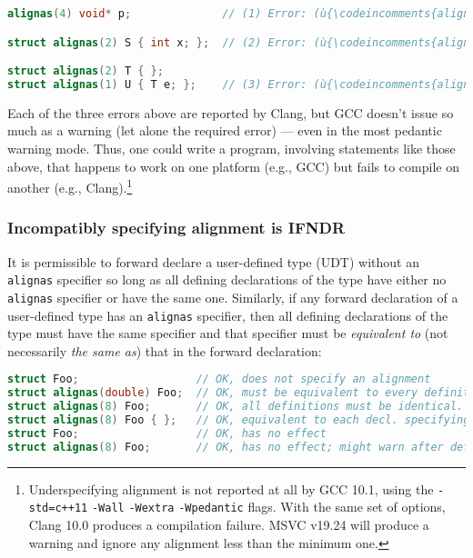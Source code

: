 \begin{lstlisting}[language=C++]
alignas(4) void* p;              // (1) Error: (ù{\codeincomments{alignas(4)}}ù) is below minimum, 8.

struct alignas(2) S { int x; };  // (2) Error: (ù{\codeincomments{alignas(2)}}ù) is below minimum, 4.

struct alignas(2) T { };
struct alignas(1) U { T e; };    // (3) Error: (ù{\codeincomments{alignas(1)}}ù) is below minimum, 2.
\end{lstlisting}

\noindent Each of the three errors above are reported by Clang, but GCC
doesn't issue so much as a warning (let alone the required error) ---
even in the most pedantic warning mode. Thus, one could write a program,
involving statements like those above, that happens to work on one
platform (e.g., GCC) but fails to compile on another (e.g.,
Clang).{\cprotect\footnote{Underspecifying alignment is not reported at
all by GCC 10.1, using the
\texttt{-std=c++11} \texttt{-Wall} \texttt{-Wextra} \mbox{\texttt{-Wpedantic}}
flags. With the same set of options, Clang 10.0 produces a compilation
failure. MSVC v19.24 will produce a warning and ignore any alignment
  less than the minimum one.}}

\subsubsection[Incompatibly specifying alignment is \textbf{IFNDR}]{Incompatibly specifying alignment is \textbf{IFNDR}}\label{incompatibly-specifying-alignment-is-ifndr}

It is permissible to forward declare a user-defined type (UDT)
without an \texttt{alignas} specifier so long as all defining
declarations of the type have either no \texttt{alignas} specifier or
have the same one. Similarly, if any forward declaration of a
user-defined type has an \texttt{alignas} specifier, then all defining
declarations of the type must have the same specifier and that specifier
must be \emph{equivalent to} (not necessarily \emph{the same as}) that
in the forward declaration:

\begin{lstlisting}[language=C++]
struct Foo;                  // OK, does not specify an alignment
struct alignas(double) Foo;  // OK, must be equivalent to every definition
struct alignas(8) Foo;       // OK, all definitions must be identical.
struct alignas(8) Foo { };   // OK, equivalent to each decl. specifying (ù{\codeincomments{alignas}}ù)
struct Foo;                  // OK, has no effect
struct alignas(8) Foo;       // OK, has no effect; might warn after definition
\end{lstlisting}


